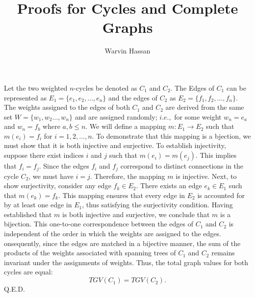 \documentclass{article}
\title{Proofs for Cycles and Complete Graphs}
\author{Warvin Hassan}
\begin{document}
\maketitle
Let the two weighted $n$-cycles be denoted as $C_{1}$ and $C_{2}$. The Edges of $C_{1}$ can be represented as $E_{1}=\{e_{1},e_{2},\ldots,e_{n}\}$ and the edges of $C_{2}$ as $E_{2}=\{f_{1},f_{2},\ldots,f_{n}\}$. The weights assigned to the edges of both $C_{1}$ and $C_{2}$ are derived from the same set $W=\{w_{1},w_{2}\ldots,w_{n}\}$ and are assigned randomly; $i.e.,$ for some weight $w_{n}=e_{a}$ and $w_{n}=f_{b}$ where $a,b \le n$. We will define a mapping $m:E_{1}\rightarrow E_{2}$ such that $m(e_{i})=f_{i}$ for $i=1,2,\ldots,n$. To demonstrate that this mapping is a bjection, we must show that it is both injective and surjective. To establish injectivity, suppose there exist indices $i$ and $j$ such that $m(e_{i})=m(e_{j})$. This implies that $f_{i}=f_{j}$. Since the edges $f_{i}$ and $f_{j}$ correspond to distinct connections in the cycle $C_{2}$, we must have $i=j$. Therefore, the mapping $m$ is injective. Next, to show surjectivity, consider any edge $f_{k}\in E_{2}$. There exists an edge $e_{k}\in E_{1}$ such that $m(e_{k})=f_{k}$. This mapping ensures that every edge in $E_{2}$ is accounted for by at least one edge in $E_{1}$, thus satisfying the surjectivity condition. Having established that $m$ is both injective and surjective, we conclude that $m$ is a bijection. This one-to-one correspondence between the edges of $C_{1}$ and $C_{2}$ is independent of the order in which the weights are assigned to the edges. onsequently, since the edges are matched in a bijective manner, the sum of the products of the weights associated with spanning trees of $C_{1}$ and $C_{2}$ remains invariant under the assignments of weights. Thus, the total graph values for both cycles are equal: $$TGV(C_{1})=TGV(C_{2}).$$Q.E.D.\\
\end{document}
